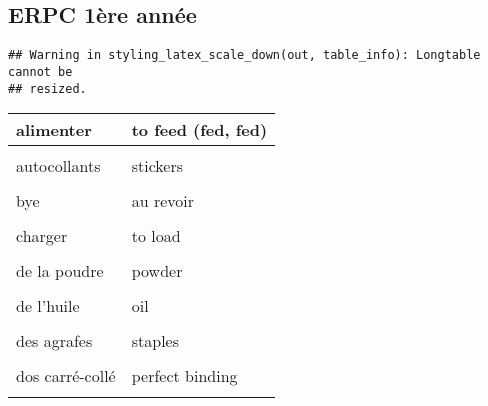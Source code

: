 \documentclass[
  10pt,
]{article}
\begin{document}
\hypertarget{erpc-1uxe8re-annuxe9e}{%
\subsection{ERPC 1ère année}\label{erpc-1uxe8re-annuxe9e}}

\begin{verbatim}
## Warning in styling_latex_scale_down(out, table_info): Longtable cannot be
## resized.
\end{verbatim}

\begin{longtable}{ll}
\toprule
alimenter & to feed (fed, fed)\\
\midrule
\cellcolor{gray!6}{à travers quelque chose} & \cellcolor{gray!6}{through}\\

autocollants & stickers\\

\cellcolor{gray!6}{brochures} & \cellcolor{gray!6}{booklets}\\

bye & au revoir\\

\cellcolor{gray!6}{cartes de visite} & \cellcolor{gray!6}{business cards}\\

charger & to load\\

\cellcolor{gray!6}{commencer} & \cellcolor{gray!6}{to begin (began, begun)}\\

de la poudre & powder\\

\cellcolor{gray!6}{de l'encre} & \cellcolor{gray!6}{ink}\\

de l'huile & oil\\

\cellcolor{gray!6}{dépliants} & \cellcolor{gray!6}{brochures}\\

des agrafes & staples\\

\cellcolor{gray!6}{deux fois} & \cellcolor{gray!6}{twice}\\

dos carré-collé & perfect binding\\

\cellcolor{gray!6}{équipement, installation} & \cellcolor{gray!6}{facility}\\


\end{longtable}
\end{document}
